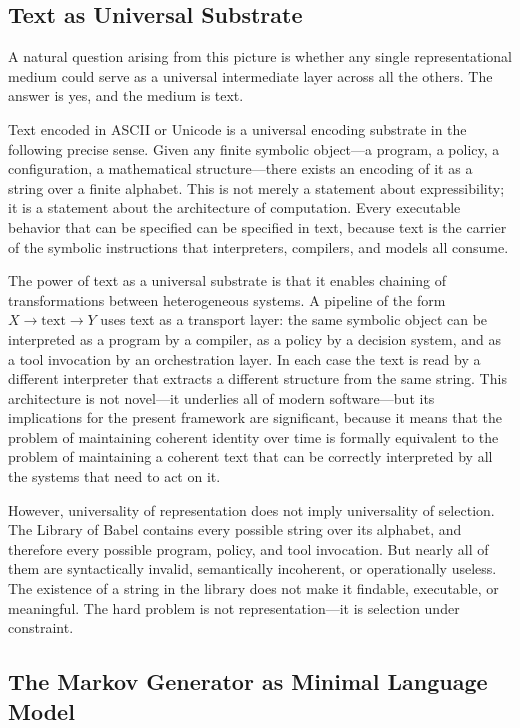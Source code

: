 \documentclass[12pt, a4paper]{article}
\theoremstyle{plain}
\theoremstyle{definition}
\theoremstyle{remark}
\begin{document}
\subsection{Text as Universal Substrate}

A natural question arising from this picture is whether any single representational medium could serve as a universal intermediate layer across all the others. The answer is yes, and the medium is text.

Text encoded in ASCII or Unicode is a universal encoding substrate in the following precise sense. Given any finite symbolic object---a program, a policy, a configuration, a mathematical structure---there exists an encoding of it as a string over a finite alphabet. This is not merely a statement about expressibility; it is a statement about the architecture of computation. Every executable behavior that can be specified can be specified in text, because text is the carrier of the symbolic instructions that interpreters, compilers, and models all consume.

The power of text as a universal substrate is that it enables chaining of transformations between heterogeneous systems. A pipeline of the form $X \to \text{text} \to Y$ uses text as a transport layer: the same symbolic object can be interpreted as a program by a compiler, as a policy by a decision system, and as a tool invocation by an orchestration layer. In each case the text is read by a different interpreter that extracts a different structure from the same string. This architecture is not novel---it underlies all of modern software---but its implications for the present framework are significant, because it means that the problem of maintaining coherent identity over time is formally equivalent to the problem of maintaining a coherent text that can be correctly interpreted by all the systems that need to act on it.

However, universality of representation does not imply universality of selection. The Library of Babel contains every possible string over its alphabet, and therefore every possible program, policy, and tool invocation. But nearly all of them are syntactically invalid, semantically incoherent, or operationally useless. The existence of a string in the library does not make it findable, executable, or meaningful. The hard problem is not representation---it is selection under constraint.

\subsection{The Markov Generator as Minimal Language Model}
\end{document}
